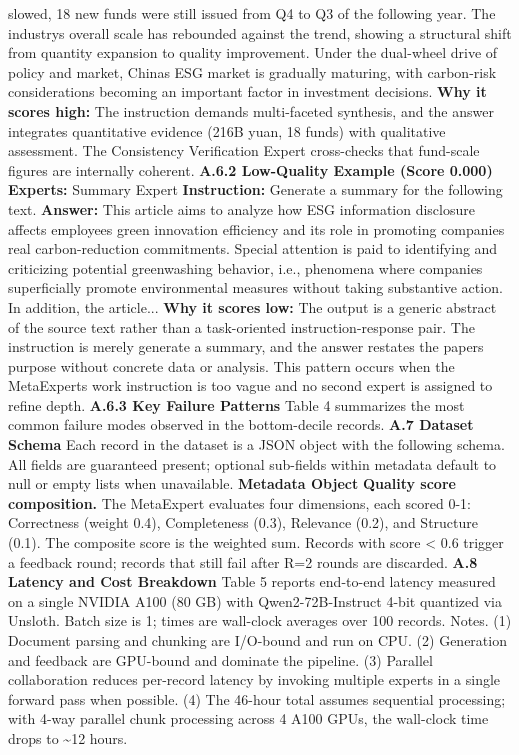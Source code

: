 \documentclass[9pt,twocolumn]{extarticle}
\begin{document}
slowed, 18 new funds were still issued from Q4 to Q3 of the following
year. The industry\textquotesingle s overall scale has rebounded against
the trend, showing a structural shift from quantity expansion to quality
improvement. Under the dual-wheel drive of policy and market,
China\textquotesingle s ESG market is gradually maturing, with
carbon-risk considerations becoming an important factor in investment
decisions.
\textbf{Why it scores high:} The instruction demands multi-faceted
synthesis, and the answer integrates quantitative evidence (216B yuan,
18 funds) with qualitative assessment. The Consistency Verification
Expert cross-checks that fund-scale figures are internally coherent.
\textbf{A.6.2 Low-Quality Example (Score 0.000)}
\textbf{Experts:} Summary Expert
\textbf{Instruction:} Generate a summary for the following text.
\textbf{Answer:} This article aims to analyze how ESG information
disclosure affects employees\textquotesingle{} green innovation
efficiency and its role in promoting companies\textquotesingle{} real
carbon-reduction commitments. Special attention is paid to identifying
and criticizing potential greenwashing behavior, i.e., phenomena where
companies superficially promote environmental measures without taking
substantive action. In addition, the article...
\textbf{Why it scores low:} The output is a generic abstract of the
source text rather than a task-oriented instruction-response pair. The
instruction is merely generate a summary, and the answer restates the
paper\textquotesingle s purpose without concrete data or analysis. This
pattern occurs when the MetaExpert\textquotesingle s work instruction is
too vague and no second expert is assigned to refine depth.
\textbf{A.6.3 Key Failure Patterns}
Table 4 summarizes the most common failure modes observed in the
bottom-decile records.
\textbf{A.7 Dataset Schema}
Each record in the dataset is a JSON object with the following schema.
All fields are guaranteed present; optional sub-fields within metadata
default to null or empty lists when unavailable.
\textbf{Metadata Object}
\textbf{Quality score composition.} The MetaExpert evaluates four
dimensions, each scored 0-1: Correctness (weight 0.4), Completeness
(0.3), Relevance (0.2), and Structure (0.1). The composite score is the
weighted sum. Records with score \textless{} 0.6 trigger a feedback
round; records that still fail after R=2 rounds are discarded.
\textbf{A.8 Latency and Cost Breakdown}
Table 5 reports end-to-end latency measured on a single NVIDIA A100 (80
GB) with Qwen2-72B-Instruct 4-bit quantized via Unsloth. Batch size is
1; times are wall-clock averages over 100 records.
Notes. (1) Document parsing and chunking are I/O-bound and run on CPU.
(2) Generation and feedback are GPU-bound and dominate the pipeline. (3)
Parallel collaboration reduces per-record latency by invoking multiple
experts in a single forward pass when possible. (4) The 46-hour total
assumes sequential processing; with 4-way parallel chunk processing
across 4 A100 GPUs, the wall-clock time drops to \textasciitilde12
hours.
\end{document}
